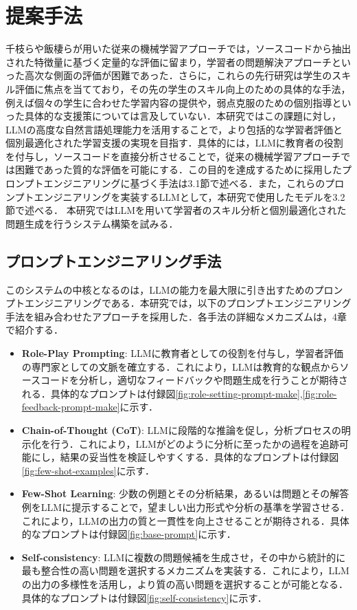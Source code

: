 \documentclass[11pt]{jreport}
\begin{document}
\chapter{提案手法}
千枝ら\cite{chieda}や飯棲ら\cite{izumi}が用いた従来の機械学習アプローチでは，ソースコードから抽出された特徴量に基づく定量的な評価に留まり，学習者の問題解決アプローチといった高次な側面の評価が困難であった．さらに，これらの先行研究は学生のスキル評価に焦点を当てており，その先の学生のスキル向上のための具体的な手法，例えば個々の学生に合わせた学習内容の提供や，弱点克服のための個別指導といった具体的な支援策については言及していない．本研究ではこの課題に対し，LLMの高度な自然言語処理能力を活用することで，より包括的な学習者評価と個別最適化された学習支援の実現を目指す．具体的には，LLMに教育者の役割を付与し，ソースコードを直接分析させることで，従来の機械学習アプローチでは困難であった質的な評価を可能にする．この目的を達成するために採用したプロンプトエンジニアリングに基づく手法は3.1節で述べる．また，これらのプロンプトエンジニアリングを実装するLLMとして，本研究で使用したモデルを3.2節で述べる．
本研究ではLLMを用いて学習者のスキル分析と個別最適化された問題生成を行うシステム構築を試みる．

\section{プロンプトエンジニアリング手法}
このシステムの中核となるのは，LLMの能力を最大限に引き出すためのプロンプトエンジニアリングである．本研究では，以下のプロンプトエンジニアリング手法を組み合わせたアプローチを採用した．各手法の詳細なメカニズムは，4章で紹介する．
\begin{itemize}
    \item \textbf{Role-Play Prompting}\cite{Role_play}: LLMに教育者としての役割を付与し，学習者評価の専門家としての文脈を確立する．これにより，LLMは教育的な観点からソースコードを分析し，適切なフィードバックや問題生成を行うことが期待される．具体的なプロンプトは付録図\ref{fig:role-setting-prompt-make},\ref{fig:role-feedback-prompt-make}に示す．
    \item \textbf{Chain-of-Thought (CoT)}\cite{CoT}: LLMに段階的な推論を促し，分析プロセスの明示化を行う．これにより，LLMがどのように分析に至ったかの過程を追跡可能にし，結果の妥当性を検証しやすくする．具体的なプロンプトは付録図\ref{fig:few-shot-examples}に示す．
    \item \textbf{Few-Shot Learning}\cite{Few-shot}: 少数の例題とその分析結果，あるいは問題とその解答例をLLMに提示することで，望ましい出力形式や分析の基準を学習させる．これにより，LLMの出力の質と一貫性を向上させることが期待される．具体的なプロンプトは付録図\ref{fig:base-prompt}に示す．
    \item \textbf{Self-consistency}\cite{Self-consitency}: LLMに複数の問題候補を生成させ，その中から統計的に最も整合性の高い問題を選択するメカニズムを実装する．これにより，LLMの出力の多様性を活用し，より質の高い問題を選択することが可能となる．具体的なプロンプトは付録図\ref{fig:self-consistency}に示す．
\end{itemize}
\end{document}

